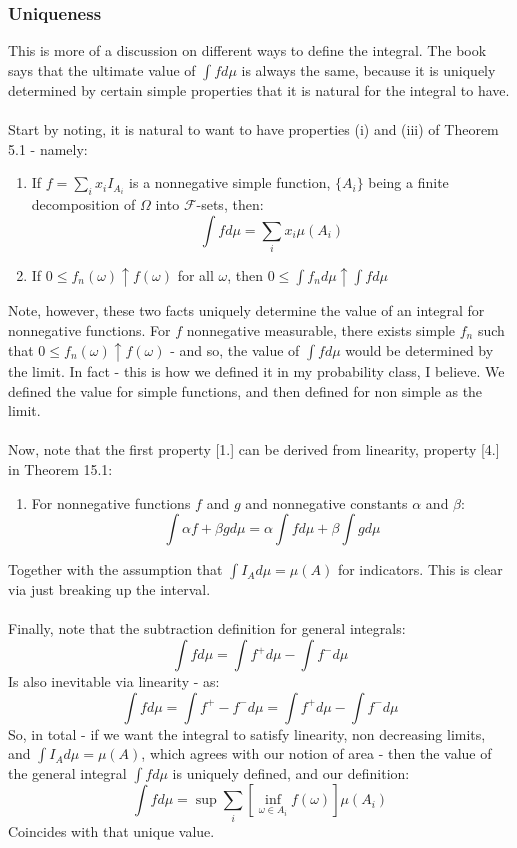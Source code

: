 \documentclass[12pt,a4paper]{article}
\newcommand{\1}[1]{\mathbbm{1}\left\{ #1 \right\}}
\newcommand{\fcal}{\mathcal{F}}
\begin{document}
\subsubsection{Uniqueness}
This is more of a discussion on different ways to define the integral. The book says that the ultimate value of $\int f d\mu$ is always the same, because it is uniquely determined by certain simple properties that it is natural for the integral to have.
\\\\
Start by noting, it is natural to want to have properties (i) and (iii) of Theorem 5.1 - namely:
\begin{enumerate}
	\item[1.] If $f = \sum_i x_i I_{A_i}$ is a nonnegative simple function, $\{A_i\}$ being a finite decomposition of $\Omega$ into $\fcal$-sets, then:
	$$
		\int f d\mu = \sum_i x_i \mu(A_i)
	$$ 

	\item[3.] If $0 \leq f_n(\omega) \uparrow f(\omega)$ for all $\omega$, then $0 \leq \int f_n d\mu \uparrow \int f d\mu$
\end{enumerate}
Note, however, these two facts uniquely determine the value of an integral for nonnegative functions. For $f$ nonnegative measurable, there exists simple $f_n$ such that $0 \leq f_n(\omega) \uparrow f(\omega)$ - and so, the value of $\int f d\mu$ would be determined by the limit. In fact - this is how we defined it in my probability class, I believe. We defined the value for simple functions, and then defined for non simple as the limit.
\\\\
Now, note that the first property [1.] can be derived from linearity, property [4.] in Theorem 15.1:
\begin{enumerate}
	\item[4.] For nonnegative functions $f$ and $g$ and nonnegative constants $\alpha$ and $\beta$:
	$$
		\int \alpha f + \beta g d\mu = \alpha \int f d\mu + \beta \int g d\mu
	$$
\end{enumerate}
Together with the assumption that $\int I_A d\mu = \mu(A)$ for indicators. This is clear via just breaking up the interval.
\\\\
Finally, note that the subtraction definition for general integrals:
$$
	\int f d\mu = \int f^+ d\mu - \int f^- d\mu
$$
Is also inevitable via linearity - as:
$$
	\int f d\mu = \int f^+ - f^- d\mu = \int f^+ d\mu - \int f^- d\mu
$$
So, in total - if we want the integral to satisfy linearity, non decreasing limits, and $\int I_A d\mu = \mu(A)$, which agrees with our notion of area - then the value of the general integral $\int f d\mu$ is uniquely defined, and our definition:
$$
	\int f d\mu = \sup \sum_i \left[\inf_{\omega \in A_i} f(\omega)\right] \mu(A_i)
$$
Coincides with that unique value.
\end{document}
